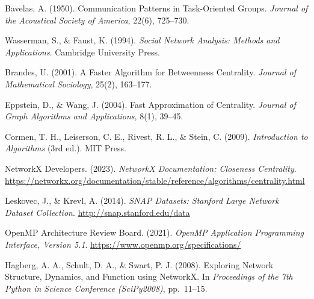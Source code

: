 \documentclass[12pt,a4paper]{article}
\begin{document}
\begin{enumerate}[label={[\arabic*]}]

  \item Bavelas, A. (1950). Communication Patterns in Task-Oriented Groups.
        \textit{Journal of the Acoustical Society of America}, 22(6), 725--730.

  \item Wasserman, S., \& Faust, K. (1994). \textit{Social Network Analysis: Methods
        and Applications}. Cambridge University Press.

  \item Brandes, U. (2001). A Faster Algorithm for Betweenness Centrality.
        \textit{Journal of Mathematical Sociology}, 25(2), 163--177.

  \item Eppstein, D., \& Wang, J. (2004). Fast Approximation of Centrality.
        \textit{Journal of Graph Algorithms and Applications}, 8(1), 39--45.

  \item Cormen, T. H., Leiserson, C. E., Rivest, R. L., \& Stein, C. (2009).
        \textit{Introduction to Algorithms} (3rd ed.). MIT Press.

  \item NetworkX Developers. (2023). \textit{NetworkX Documentation: Closeness
        Centrality}. \url{https://networkx.org/documentation/stable/reference/algorithms/centrality.html}

  \item Leskovec, J., \& Krevl, A. (2014). \textit{SNAP Datasets: Stanford Large
        Network Dataset Collection}. \url{http://snap.stanford.edu/data}

  \item OpenMP Architecture Review Board. (2021). \textit{OpenMP Application
        Programming Interface, Version 5.1}.
        \url{https://www.openmp.org/specifications/}

  \item Hagberg, A. A., Schult, D. A., \& Swart, P. J. (2008). Exploring Network
        Structure, Dynamics, and Function using NetworkX.
        In \textit{Proceedings of the 7th Python in Science Conference (SciPy2008)},
        pp.~11--15.

\end{enumerate}
\end{document}
